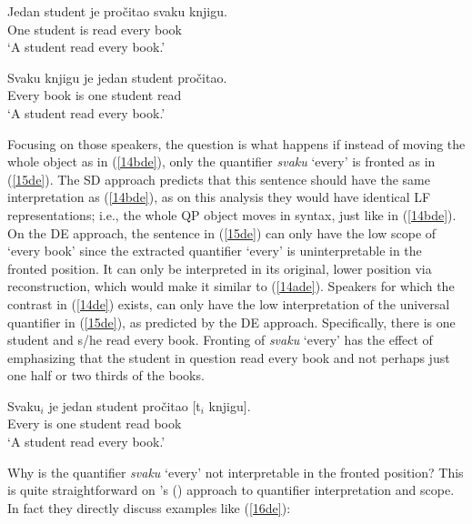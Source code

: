 \documentclass[output=paper]{langscibook}
\begin{document}
\begin{exe}
\ex \label{14de}
\begin{xlist}
\ex \label{14ade}
\gll Jedan student je pročitao svaku knjigu.\\
One student is read every book\\
\glt ‘A student read every book.’ 


\ex \label{14bde}
\gll Svaku knjigu je jedan student pročitao.\\
Every book is one student read\\
\glt ‘A student read every book.’ 

\end{xlist}
\end{exe}

Focusing on those speakers, the question is what happens if instead of moving the whole object as in (\ref{14bde}), only the quantifier \textit{svaku} ‘every’ is fronted as in (\ref{15de}). The SD approach predicts that this sentence should have the same interpretation as (\ref{14bde}), as on this analysis they would have identical LF representations; i.e., the whole QP object moves in syntax, just like in (\ref{14bde}). On the DE approach, the sentence in (\ref{15de}) can only have the low scope of ‘every book’ since the extracted quantifier ‘every’ is uninterpretable in the fronted position. It can only be interpreted in its original, lower position via reconstruction, which would make it similar to (\ref{14ade}). Speakers for which the contrast in (\ref{14de}) exists, can only have the low interpretation of the universal quantifier in (\ref{15de}), as predicted by the DE approach. Specifically, there is one student and s/he read every book. Fronting of \textit{svaku} ‘every’ has the effect of emphasizing that the student in question read every book and not perhaps just one half or two thirds of the books. 

\begin{exe}
\ex \label{15de}
\gll Svaku$_{i}$ je jedan student pročitao [t$_{i}$ knjigu].\\
Every is one student read {} book\\
\glt ‘A student read every book.’ 
\end{exe}

Why is the quantifier \textit{svaku} ‘every’ not interpretable in the fronted position? This is quite straightforward on \citeauthor{HeimKratzer1998}’s (\citeyear{HeimKratzer1998}) approach to quantifier interpretation and scope.  In fact they directly discuss examples like (\ref{16de}):\largerpage
\end{document}
